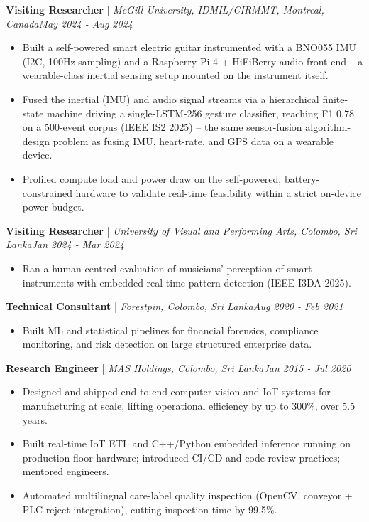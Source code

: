 \documentclass[11pt]{article}
\newenvironment{cvrole}[5]{%
  \par\noindent\textbf{\large #1} | \textit{\small #2, #3}\hfill \textit{\small #4 - #5}\par
  \begin{itemize}[leftmargin=2em, itemsep=-0.3em, topsep=-0.5em]%
}{%
  \end{itemize}\par\noindent\mbox{}\par\vspace{0.1em}%
}
\begin{document}
\begin{cvrole}{Visiting Researcher}{McGill University, IDMIL/CIRMMT}{Montreal, Canada}{May 2024}{Aug 2024}
  \item Built a self-powered smart electric guitar instrumented with a BNO055 IMU (I2C, 100Hz sampling) and a Raspberry Pi 4 + HiFiBerry audio front end -- a wearable-class inertial sensing setup mounted on the instrument itself.
  \item Fused the inertial (IMU) and audio signal streams via a hierarchical finite-state machine driving a single-LSTM-256 gesture classifier, reaching F1 0.78 on a 500-event corpus (IEEE IS2 2025) -- the same sensor-fusion algorithm-design problem as fusing IMU, heart-rate, and GPS data on a wearable device.
  \item Profiled compute load and power draw on the self-powered, battery-constrained hardware to validate real-time feasibility within a strict on-device power budget.
\end{cvrole}

\begin{cvrole}{Visiting Researcher}{University of Visual and Performing Arts}{Colombo, Sri Lanka}{Jan 2024}{Mar 2024}
  \item Ran a human-centred evaluation of musicians' perception of smart instruments with embedded real-time pattern detection (IEEE I3DA 2025).
\end{cvrole}

\begin{cvrole}{Technical Consultant}{Forestpin}{Colombo, Sri Lanka}{Aug 2020}{Feb 2021}
  \item Built ML and statistical pipelines for financial forensics, compliance monitoring, and risk detection on large structured enterprise data.
\end{cvrole}

\begin{cvrole}{Research Engineer}{MAS Holdings}{Colombo, Sri Lanka}{Jan 2015}{Jul 2020}
  \item Designed and shipped end-to-end computer-vision and IoT systems for manufacturing at scale, lifting operational efficiency by up to 300\%, over 5.5 years.
  \item Built real-time IoT ETL and C++/Python embedded inference running on production floor hardware; introduced CI/CD and code review practices; mentored engineers.
  \item Automated multilingual care-label quality inspection (OpenCV, conveyor + PLC reject integration), cutting inspection time by 99.5\%.
\end{cvrole}
\end{document}
